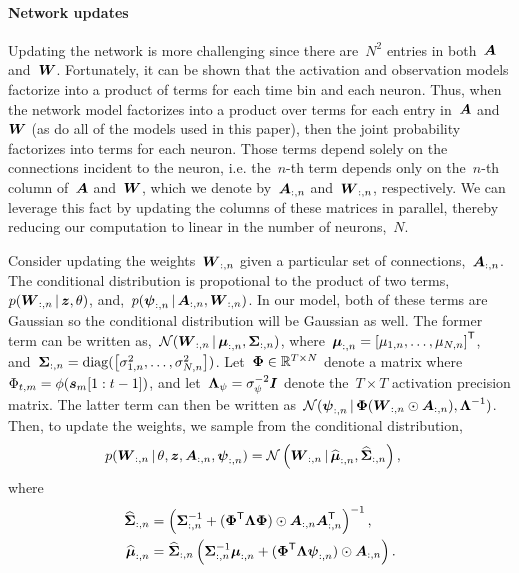 \paragraph{Network updates} Updating the network is more challenging since there are~$N^2$ entries in both~$\boldsymbol{A}$ and~$\boldsymbol{W}$. 
Fortunately, it can be shown that the activation and observation models factorize into a product of terms for each time bin and each neuron.
Thus, when the network model factorizes into a product over terms for each entry in~$\boldsymbol{A}$ and~$\boldsymbol{W}$ (as do all of the models used in this paper), then the joint probability factorizes into terms for each neuron. 
Those terms depend solely on the connections incident to the neuron, i.e. the~$n$-th term depends only on the~$n$-th column of~$\boldsymbol{A}$ and~$\boldsymbol{W}$, which we denote by~$\boldsymbol{A}_{:,n}$ and~$\boldsymbol{W}_{:,n}$, respectively.
We can leverage this fact by updating the columns of these matrices in parallel, thereby reducing our computation to linear in the number of neurons,~$N$.

Consider updating the weights~$\boldsymbol{W}_{:,n}$ given a particular set of connections,~$\boldsymbol{A}_{:,n}$. The conditional distribution is propotional to the product of two terms,~$p(\boldsymbol{W}_{:,n} \,|\, \boldsymbol{z}, \theta)$, and,~$p(\boldsymbol{\psi}_{:,n} \,|\, \boldsymbol{A}_{:,n}, \boldsymbol{W}_{:,n})$. In our model, both of these terms are Gaussian so the conditional distribution will be Gaussian as well. The former term can be written as,~$\mathcal{N}(\boldsymbol{W}_{:,n} \,|\, \boldsymbol{\mu}_{:,n}, \boldsymbol{\Sigma}_{:,n})$, where~$\boldsymbol{\mu}_{:,n} = \left[\mu_{1,n}, \ldots, \mu_{N,n} \right]^{\mathsf{T}}$, and~$\boldsymbol{\Sigma}_{:,n} = \mathrm{diag}(\left[\sigma_{1,n}^2, \ldots, \sigma_{N,n}^2 \right])$. Let~$\boldsymbol{\Phi} \in \mathbb{R}^{T \times N}$ denote a matrix where~$\Phi_{t,m}=\phi(\boldsymbol{s}_m[1:t-1])$, and let~$\boldsymbol{\Lambda}_\psi = \sigma_\psi^{-2} \boldsymbol{I}$ denote the~$T \times T$ activation precision matrix. The latter term can then be written as~$\mathcal{N}(\boldsymbol{\psi}_{:,n} \,|\, \boldsymbol{\Phi} (\boldsymbol{W}_{:,n} \odot \boldsymbol{A}_{:,n}), \boldsymbol{\Lambda}^{-1})$. Then, to update the weights, we sample from the conditional distribution,
\begin{align}
p(\boldsymbol{W}_{:,n} \,|\, \theta, \boldsymbol{z}, \boldsymbol{A}_{:,n}, \boldsymbol{\psi}_{:,n}) &= \mathcal{N} \left( \boldsymbol{W}_{:,n} \,|\, \widehat{\boldsymbol{\mu}}_{:,n}, \widehat{\boldsymbol{\Sigma}}_{:,n} \right),
\end{align}
where
\begin{align}
\widehat{\boldsymbol{\Sigma}}_{:,n} &= \left( \boldsymbol{\Sigma}_{:,n}^{-1} + (\boldsymbol{\Phi}^{\mathsf{T}} \boldsymbol{\Lambda} \boldsymbol{\Phi}) \odot \boldsymbol{A}_{:,n} \boldsymbol{A}_{:,n}^{\mathsf{T}} \right)^{-1}, \\
\widehat{\boldsymbol{\mu}}_{:,n} &= \widehat{\boldsymbol{\Sigma}}_{:,n}
\left( \boldsymbol{\Sigma}_{:,n}^{-1} \boldsymbol{\mu}_{:,n} + (\boldsymbol{\Phi}^{\mathsf{T}} \boldsymbol{\Lambda} \boldsymbol{\psi}_{:,n}) \odot \boldsymbol{A}_{:,n} \right).
\end{align}

